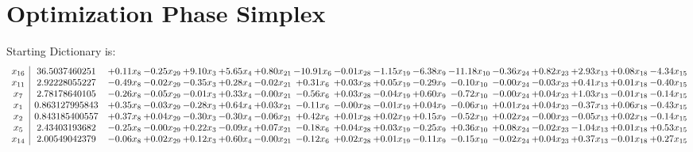 \documentclass[9pt]{article}
\begin{document}
\section{Optimization Phase Simplex}
Starting Dictionary is:
\[\begin{array}{c| c c@{\hskip 2pt} c@{\hskip 2pt} c@{\hskip 2pt} c@{\hskip 2pt} c@{\hskip 2pt} c@{\hskip 2pt} c@{\hskip 2pt} c@{\hskip 2pt} c@{\hskip 2pt} c@{\hskip 2pt} c@{\hskip 2pt} c@{\hskip 2pt} c@{\hskip 2pt} c@{\hskip 2pt} c@{\hskip 2pt} }
 x_{16}   &  36.5037460251 & +  0.11 x_{8} & -0.25 x_{29} & +  9.10 x_{3} & +  5.65 x_{4} & +  0.80 x_{21} & -10.91 x_{6} & -0.01 x_{28} & -1.15 x_{19} & -6.38 x_{9} & -11.18 x_{10} & -0.36 x_{24} & +  0.82 x_{23} & +  2.93 x_{13} & +  0.08 x_{18} & -4.34 x_{15}\\
 x_{11}   &  2.92228055227 & -0.49 x_{8} & -0.02 x_{29} & -0.35 x_{3} & +  0.28 x_{4} & -0.02 x_{21} & +  0.31 x_{6} & +  0.03 x_{28} & +  0.05 x_{19} & -0.29 x_{9} & -0.10 x_{10} & -0.00 x_{24} & -0.03 x_{23} & +  0.41 x_{13} & +  0.01 x_{18} & -0.40 x_{15}\\
 x_{7}   &  2.78178640105 & -0.26 x_{8} & -0.05 x_{29} & -0.01 x_{3} & +  0.33 x_{4} & -0.00 x_{21} & -0.56 x_{6} & +  0.03 x_{28} & -0.04 x_{19} & +  0.60 x_{9} & -0.72 x_{10} & -0.00 x_{24} & +  0.04 x_{23} & +  1.03 x_{13} & -0.01 x_{18} & -0.14 x_{15}\\
 x_{1}   &  0.863127995843 & +  0.35 x_{8} & -0.03 x_{29} & -0.28 x_{3} & +  0.64 x_{4} & +  0.03 x_{21} & -0.11 x_{6} & -0.00 x_{28} & -0.01 x_{19} & +  0.04 x_{9} & -0.06 x_{10} & +  0.01 x_{24} & +  0.04 x_{23} & -0.37 x_{13} & +  0.06 x_{18} & -0.43 x_{15}\\
 x_{2}   &  0.843185400557 & +  0.37 x_{8} & +  0.04 x_{29} & -0.30 x_{3} & -0.30 x_{4} & -0.06 x_{21} & +  0.42 x_{6} & +  0.01 x_{28} & +  0.02 x_{19} & +  0.15 x_{9} & -0.52 x_{10} & +  0.02 x_{24} & -0.00 x_{23} & -0.05 x_{13} & +  0.02 x_{18} & -0.14 x_{15}\\
 x_{5}   &  2.43403193682 & -0.25 x_{8} & -0.00 x_{29} & +  0.22 x_{3} & -0.09 x_{4} & +  0.07 x_{21} & -0.18 x_{6} & +  0.04 x_{28} & +  0.03 x_{19} & -0.25 x_{9} & +  0.36 x_{10} & +  0.08 x_{24} & -0.02 x_{23} & -1.04 x_{13} & +  0.01 x_{18} & +  0.53 x_{15}\\
 x_{14}   &  2.00549042379 & -0.06 x_{8} & +  0.02 x_{29} & +  0.12 x_{3} & +  0.60 x_{4} & -0.00 x_{21} & -0.12 x_{6} & +  0.02 x_{28} & +  0.01 x_{19} & -0.11 x_{9} & -0.15 x_{10} & -0.02 x_{24} & +  0.04 x_{23} & +  0.37 x_{13} & -0.01 x_{18} & +  0.27 x_{15}\\

\end{array}\]
\end{document}
